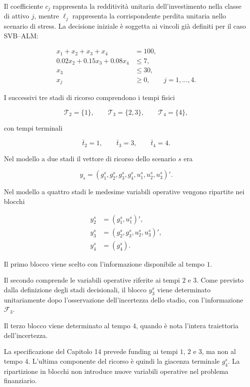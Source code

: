 Il coefficiente $c_j$ rappresenta la redditivit\`a
unitaria dell'investimento nella classe di attivo $j$,
mentre $\ell_j$ rappresenta la corrispondente perdita
unitaria nello scenario di stress. La decisione iniziale \`e soggetta
ai vincoli gi\`a definiti per il caso SVB--ALM:

\[
\begin{aligned}
x_1+x_2+x_3+x_4&=100,\\
0.02x_2+0.15x_3+0.08x_4&\leq7,\\
x_3&\leq30,\\
x_j&\geq0,\qquad j=1,\ldots,4.
\end{aligned}
\]

I successivi tre stadi di ricorso
comprendono i tempi fisici

\[
\mathcal T_2=\{1\},
\qquad
\mathcal T_3=\{2,3\},
\qquad
\mathcal T_4=\{4\},
\]

con tempi terminali

\[
\bar t_2=1,
\qquad
\bar t_3=3,
\qquad
\bar t_4=4.
\]

Nel modello a due stadi il vettore
di ricorso dello scenario $s$ era

\[
y_s=
(g_1^s,g_2^s,g_3^s,g_4^s,
u_1^s,u_2^s,u_3^s)'.
\]

Nel modello a quattro stadi
le medesime variabili operative
vengono ripartite nei blocchi

\[
\begin{aligned}
y_2^s
&=
(g_1^s,u_1^s)',
\\[4pt]
y_3^s
&=
(g_2^s,g_3^s,u_2^s,u_3^s)',
\\[4pt]
y_4^s
&=
(g_4^s).
\end{aligned}
\]

Il primo blocco viene scelto
con l'informazione disponibile
al tempo $1$.

Il secondo comprende le variabili
operative riferite ai tempi $2$ e $3$.
Come previsto dalla definizione
degli stadi decisionali,
il blocco $y_3^s$ viene determinato
unitariamente dopo l'osservazione
dell'incertezza dello stadio,
con l'informazione $\mathcal F_3$.

Il terzo blocco viene determinato
al tempo $4$, quando \`e nota
l'intera traiettoria dell'incertezza.

La specificazione del Capitolo 14
prevede funding ai tempi $1$, $2$ e $3$,
ma non al tempo $4$. L'ultima
componente del ricorso \`e quindi
la giacenza terminale $g_4^s$.
La ripartizione in blocchi
non introduce nuove variabili
operative nel problema finanziario.


